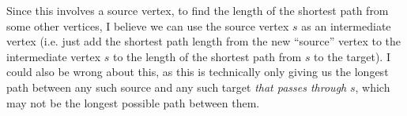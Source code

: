 \documentclass[12pt]{article}
\begin{document}
\begin{enumerate}
        Since this involves a source vertex, to find the length of the shortest path from some other vertices, I believe 
        we can use the source vertex $s$ as an intermediate vertex (i.e. just add the shortest path length from the new 
        ``source'' vertex to the intermediate vertex $s$ to the length of the shortest path from $s$ to the target). I 
        could also be wrong about this, as this is technically only giving us the longest path between any such source 
        and any such target \textit{that passes through} $s$, which may not be the longest possible path between them.

    \end{enumerate}
\end{document}
